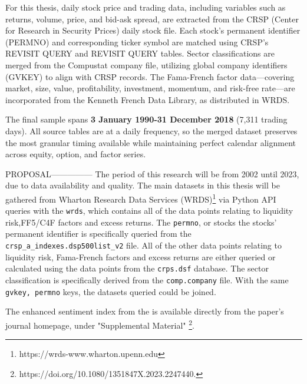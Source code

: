 For this thesis, daily stock price and trading data, including variables such as returns, volume, price, and bid-ask spread, are extracted from the CRSP (Center for Research in Security Prices) daily stock file. Each stock's permanent identifier (PERMNO) and corresponding ticker symbol are matched using CRSP's {REVISIT QUERY} and {REVISIT QUERY} tables. Sector classifications are merged from the Compustat company file, utilizing global company identifiers (GVKEY) to align with CRSP records. The Fama-French factor data—covering market, size, value, profitability, investment, momentum, and risk-free rate—are incorporated from the Kenneth French Data Library, as distributed in WRDS.

The final sample spans \textbf{3 January 1990-31 December 2018} (7{,}311 trading days). All source tables are at a daily frequency, so the merged dataset preserves the most granular timing available while maintaining perfect calendar alignment across equity, option, and factor series.







PROPOSAL---------------
The period of this research will be from 2002 until 2023, due to data availability and quality. The main datasets in this thesis will be gathered from Wharton Research Data Services (WRDS)\footnote{https://wrds-www.wharton.upenn.edu} via Python API queries with the \texttt{wrds}, which contains all of the data points relating to liquidity risk,FF5/C4F factors and excess returns. The \texttt{permno}, or stocks the stocks' permanent identifier is specifically queried from the \texttt{crsp\_a\_indexes.dsp500list\_v2}
file. All of the other data points relating to liquidity risk, Fama-French factors and excess returns are either queried or calculated using the data points from the \texttt{crps.dsf} database. The sector classification is specifically derived from the \texttt{comp.company} file. With the same \texttt{gvkey, permno} keys, the datasets queried could be joined.

The enhanced sentiment index from the  is available directly from the paper's journal homepage, under "Supplemental Material" \footnote{https://doi.org/10.1080/1351847X.2023.2247440.}.